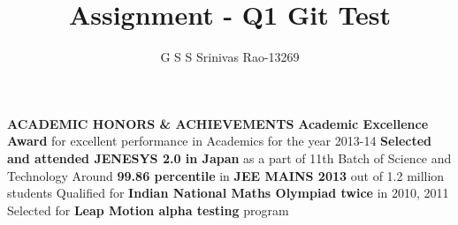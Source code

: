 \documentclass[9pt]{article}
\title{Assignment - Q1 Git\cite{Github} Test}
\author{G S S Srinivas Rao-13269}
\date{}
\begin{document}
\maketitle

\vspace{0.5cm}
\raggedright
\textbf{\large{ACADEMIC HONORS \& ACHIEVEMENTS}}\vspace{0.1cm}
\newline
\textbf{Academic Excellence Award} for excellent performance in Academics for the year 2013-14
\newline
\textbf{Selected and attended JENESYS 2.0 in Japan} as a part of 11th Batch of Science and Technology
\newline
Around \textbf{99.86 percentile} in \textbf{JEE MAINS 2013} out of 1.2 million students
\newline
Qualified for \textbf{Indian National Maths Olympiad twice} in 2010, 2011
\newline
Selected for \textbf{Leap Motion alpha testing} program



\end{document}
